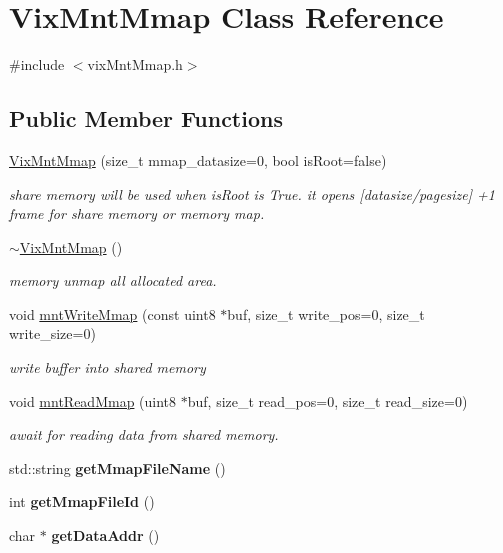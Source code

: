\hypertarget{class_vix_mnt_mmap}{}\section{Vix\+Mnt\+Mmap Class Reference}
\label{class_vix_mnt_mmap}


{\ttfamily \#include $<$vix\+Mnt\+Mmap.\+h$>$}

\subsection*{Public Member Functions}
\begin{DoxyCompactItemize}
\item 
\hyperlink{class_vix_mnt_mmap_ae1a3d9c99b9d94ac5a8dc14641bbb8b9}{Vix\+Mnt\+Mmap} (size\+\_\+t mmap\+\_\+datasize=0, bool is\+Root=false)
\begin{DoxyCompactList}\small\item\em share memory will be used when is\+Root is True. it opens \mbox{[}datasize/pagesize\mbox{]} +1 frame for share memory or memory map. \end{DoxyCompactList}\item 
\hypertarget{class_vix_mnt_mmap_a302fca3fe8f9c29795462ccb31c8374e}{}\label{class_vix_mnt_mmap_a302fca3fe8f9c29795462ccb31c8374e} 
\hyperlink{class_vix_mnt_mmap_a302fca3fe8f9c29795462ccb31c8374e}{$\sim$\+Vix\+Mnt\+Mmap} ()
\begin{DoxyCompactList}\small\item\em memory unmap all allocated area. \end{DoxyCompactList}\item 
void \hyperlink{class_vix_mnt_mmap_ae2526dddb9655664521b7ef7acdb84d1}{mnt\+Write\+Mmap} (const uint8 $\ast$buf, size\+\_\+t write\+\_\+pos=0, size\+\_\+t write\+\_\+size=0)
\begin{DoxyCompactList}\small\item\em write buffer into shared memory \end{DoxyCompactList}\item 
void \hyperlink{class_vix_mnt_mmap_a581db8ef5fcd8855118544682771d1af}{mnt\+Read\+Mmap} (uint8 $\ast$buf, size\+\_\+t read\+\_\+pos=0, size\+\_\+t read\+\_\+size=0)
\begin{DoxyCompactList}\small\item\em await for reading data from shared memory. \end{DoxyCompactList}\item 
\hypertarget{class_vix_mnt_mmap_adb8d0169992faad3d67deb7875c0053d}{}\label{class_vix_mnt_mmap_adb8d0169992faad3d67deb7875c0053d} 
std\+::string {\bfseries get\+Mmap\+File\+Name} ()
\item 
\hypertarget{class_vix_mnt_mmap_abf618b63f7859651d131fef4184b2750}{}\label{class_vix_mnt_mmap_abf618b63f7859651d131fef4184b2750} 
int {\bfseries get\+Mmap\+File\+Id} ()
\item 
\hypertarget{class_vix_mnt_mmap_a1390ed177d4f162c5109effe101e741d}{}\label{class_vix_mnt_mmap_a1390ed177d4f162c5109effe101e741d} 
char $\ast$ {\bfseries get\+Data\+Addr} ()
\end{DoxyCompactItemize}
